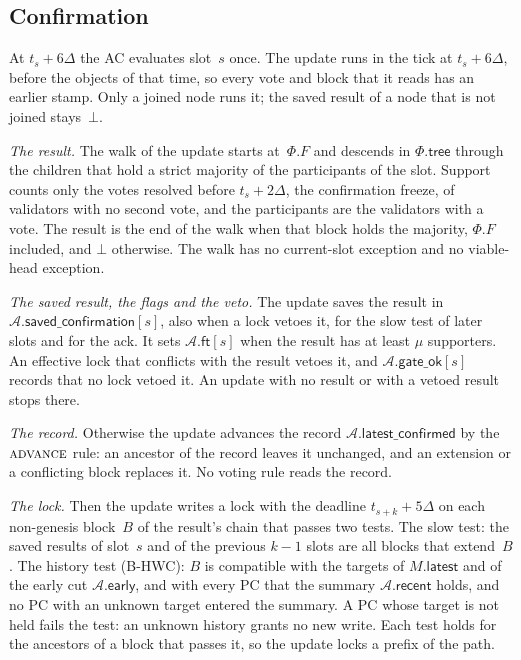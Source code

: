 \documentclass{article}
\newcommand{\AC}{\mathcal A}
\newcommand{\Fr}{\Phi}
\newcommand{\tree}{\mathsf{tree}}
\newcommand{\latestConfirmed}{\mathsf{latest\_confirmed}}
\newcommand{\savedConfirmation}{\mathsf{saved\_confirmation}}
\begin{document}
\subsection{Confirmation}\label{sec:sa-confirmation}

At $t_s+6\Delta$ the AC evaluates slot~$s$ once.  The update runs in the
tick at $t_s+6\Delta$, before the objects of that time, so every vote and
block that it reads has an earlier stamp.  Only a joined node runs it; the
saved result of a node that is not joined stays~$\bot$.

\emph{The result.}  The walk of the update starts at~$\Fr.F$ and descends
in $\Fr.\tree$ through the children that hold a strict majority of the
participants of the slot.  Support counts only the votes resolved before
$t_s+2\Delta$, the confirmation freeze, of validators with no second vote, and
the participants are the validators with a vote.  The result is the end of
the walk when that block holds the majority, $\Fr.F$ included, and $\bot$
otherwise.  The walk has no current-slot exception and no viable-head
exception.

\emph{The saved result, the flags and the veto.}  The update saves the
result in $\AC.\savedConfirmation[s]$, also when a lock vetoes it, for the
slow test of later slots and for the ack.  It sets $\AC.\mathsf{ft}[s]$
when the result has at least $\mu$ supporters.  An effective lock that
conflicts with the result vetoes it, and $\AC.\mathsf{gate\_ok}[s]$
records that no lock vetoed it.  An update with no result or with a vetoed
result stops there.

\emph{The record.}  Otherwise the update advances the record
$\AC.\latestConfirmed$ by the $\Call{advance}{}$ rule: an ancestor of the
record leaves it unchanged, and an extension or a conflicting block
replaces it.  No voting rule reads the record.

\emph{The lock.}  Then the update writes a lock with the deadline
$t_{s+k}+5\Delta$ on each non-genesis block~$B$ of the result's chain that
passes two tests.  The slow test: the saved results of slot~$s$ and of
the previous $k-1$ slots are all blocks that extend~$B$.  The history test
(B-HWC): $B$ is compatible with the targets of $M.\mathsf{latest}$ and of
the early cut $\AC.\mathsf{early}$, and with every PC that the summary
$\AC.\mathsf{recent}$ holds, and no PC with an unknown target entered the
summary.  A PC whose target is not held fails the test: an unknown history
grants no new write.  Each test holds for the ancestors of a block that
passes it, so the update locks a prefix of the path.
\end{document}
